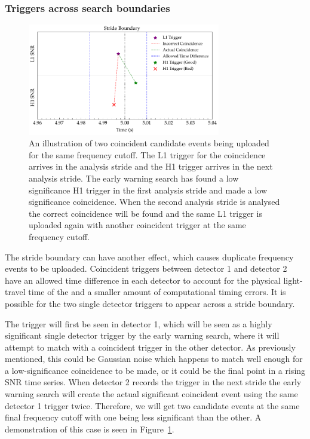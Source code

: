 \subsubsection{\label{6:sec:trigs-across-bounds}Triggers across search boundaries}
%
\begin{figure}
       \centering
    \includegraphics[width=0.75\textwidth]{images/6_earlywarning/identified-problems/trigs_across_bounds.pdf}
    \caption{An illustration of two coincident candidate events being uploaded for the same frequency cutoff. The L1 trigger for the coincidence arrives in the analysis stride and the H1 trigger arrives in the next analysis stride. The early warning search has found a low significance H1 trigger in the first analysis stride and made a low significance coincidence. When the second analysis stride is analysed the correct coincidence will be found and the same L1 trigger is uploaded again with another coincident trigger at the same frequency cutoff.}
    \label{6:fig:triggers_across_boundaries}
\end{figure}
%
The stride boundary can have another effect, which causes duplicate frequency events to be uploaded. Coincident triggers between detector 1 and detector 2 have an allowed time difference in each detector to account for the physical light-travel time of the \gw and a smaller amount of computational timing errors. It is possible for the two single detector triggers to appear across a stride boundary.

The trigger will first be seen in detector 1, which will be seen as a highly significant single detector trigger by the early warning search, where it will attempt to match with a coincident trigger in the other detector. As previously mentioned, this could be Gaussian noise which happens to match well enough for a low-significance coincidence to be made, or it could be the final point in a rising SNR time series. When detector 2 records the trigger in the next stride the early warning search will create the actual significant coincident event using the same detector 1 trigger twice. Therefore, we will get two candidate events at the same final frequency cutoff with one being less significant than the other. A demonstration of this case is seen in Figure~\ref{6:fig:triggers_across_boundaries}.

